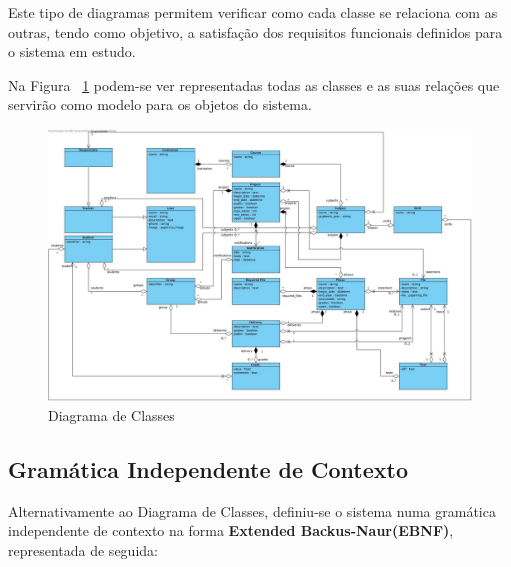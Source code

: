 Este tipo de diagramas permitem verificar como cada classe se relaciona com as outras, tendo como objetivo, a satisfação dos requisitos funcionais definidos para o sistema em estudo. 

Na Figura ~\ref{fig:diagrama-classes} podem-se ver representadas todas as classes e as suas relações que servirão como modelo para os objetos do sistema.

\begin{figure}[H] 
  \centering
  \includegraphics[width=1\textwidth,center]{images/modelo_dados/diagrama-classes}
  \caption{Diagrama de Classes}
  \label{fig:diagrama-classes}
\end{figure}

\subsection{Gramática Independente de Contexto}

Alternativamente ao Diagrama de Classes, definiu-se o sistema numa gramática independente de contexto na forma \textbf{Extended Backus-Naur(EBNF)}, representada de seguida:

